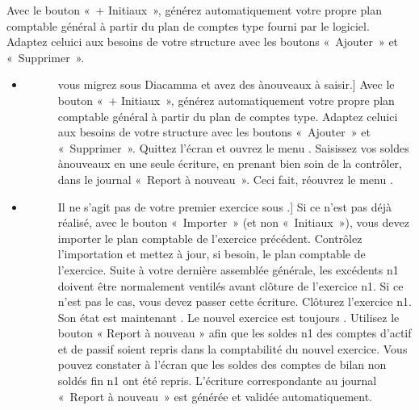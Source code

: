 \documentclass[a4paper,10pt,oneside,french]{sphinxmanual}
\begin{document}
\sphinxAtStartPar
Avec le bouton « + Initiaux », générez automatiquement votre propre plan comptable général à partir du plan de comptes type fourni par le logiciel.
Adaptez celui\sphinxhyphen{}ci aux besoins de votre structure avec les boutons « Ajouter » et « Supprimer ».
\begin{itemize}
\item {} \begin{description}
\item[{}] \leavevmode{[}vous migrez sous Diacamma et avez des à\sphinxhyphen{}nouveaux à saisir.{]}
\sphinxAtStartPar
Avec le bouton « + Initiaux », générez automatiquement votre propre plan comptable général à partir du plan de comptes type.
Adaptez celui\sphinxhyphen{}ci aux besoins de votre structure avec les boutons « Ajouter » et « Supprimer ».
Quittez l’écran  et ouvrez le menu .
Saisissez vos soldes à\sphinxhyphen{}nouveaux en une seule écriture, en prenant bien soin de la contrôler, dans le journal « Report à nouveau ».
Ceci fait, réouvrez le menu .

\end{description}

\item {} \begin{description}
\item[{}] \leavevmode{[}Il ne s’agit pas de votre premier exercice sous .{]}
\sphinxAtStartPar
Si ce n’est pas déjà réalisé, avec le bouton « Importer » (et non « Initiaux »), vous devez importer le plan comptable de l’exercice précédent.
Contrôlez l’importation et mettez à jour, si besoin, le plan comptable de l’exercice.
Suite à votre dernière assemblée générale, les excédents n\sphinxhyphen{}1 doivent être normalement ventilés avant clôture de l’exercice n\sphinxhyphen{}1. Si ce n’est pas le cas, vous devez passer cette écriture.
Clôturez l’exercice n\sphinxhyphen{}1. Son état est maintenant \sphinxstylestrong{{[}terminé{]}}. Le nouvel exercice est toujours \sphinxstylestrong{{[}en création{]}}.
Utilisez le bouton « Report à nouveau » afin que les soldes n\sphinxhyphen{}1 des comptes d’actif et de passif soient repris dans la comptabilité du nouvel exercice. Vous pouvez constater à l’écran que les soldes des comptes de bilan non soldés fin n\sphinxhyphen{}1 ont été repris. L’écriture correspondante  au journal « Report à nouveau » est générée et validée automatiquement.

\end{description}

\end{itemize}
\end{document}
